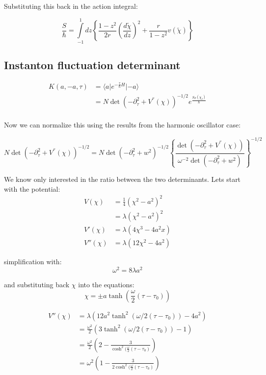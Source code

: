 \documentclass[12pt,a4paper]{article}
\newcommand{\ket}[1]{{ |#1 \rangle}}
\newcommand{\bra}[1]{{\langle#1|}}
\numberwithin{equation}{section}
\begin{document}
Substituting this back in the action integral:

\begin{equation}
\frac{S}{\hbar} = \int\limits_{-1}^1 dz \left\lbrace \frac{1-z^2}{2r} \left( \frac{d \tilde{\chi}}{dz} \right)^2 + \frac{r}{1-z^2} v(\tilde{\chi}) \right\rbrace
\end{equation}


\subsection{Instanton fluctuation determinant}

\begin{align}
K(a,-a,\tau) &= \bra{a} e^{-\frac{\tau}{\hbar}H} \ket{-a} \\
&= N \det (-\partial_\tau ^2 + V^{''}(\chi))^{-1/2} e^{\frac{S_E (\chi_{I})}{\hbar}}\\
\end{align}

Now we can normalize this using the results from the harmonic oscillator case:

\begin{equation}
N \det (-\partial_\tau ^2 + V^{''}(\chi))^{-1/2} = N \det (-\partial_\tau ^2 + w^2)^{-1/2} \left\lbrace\frac{ \det (-\partial_\tau ^2 + V^{''}(\chi))}{\omega^{-2}\det (-\partial_\tau ^2 + w^2)}\right\rbrace^{-1/2}
\end{equation}

We know only interested in the ratio between the two determinants. Lets start with the potential:
\begin{align}
V(\chi) &= \frac{1}{4}(\chi^2 -a^2)^2 \\
&= \lambda (\chi^2 - a^2 )^2 \\
V'(\chi) &= \lambda (4\chi^3 - 4a^2 x) \\
V''(\chi) &= \lambda (12\chi^2 - 4a^2)
\end{align}

simplification with:
\begin{equation}
\omega^2 = 8\lambda a^2
\end{equation}

and substituting back $\chi$ into the equations:
\begin{equation}
\chi = \pm a \tanh (\frac{\omega}{2} (\tau - \tau_0))
\end{equation}

\begin{align}
V''(\chi) &= \lambda (12 a^2 \tanh^2 (\omega /2 (\tau - \tau_0)) - 4a^2)\\
&= \frac{\omega^2}{2} (3 \tanh^2 (\omega /2 (\tau - \tau_0)) - 1) \\
&= \frac{\omega^2}{2} \left( 2 - \frac{3}{\cosh^2 (\frac{\omega}{2} (\tau-\tau_0)}\right) \\
&= \omega^2 \left( 1 - \frac{3}{2\cosh^2 (\frac{\omega}{2} (\tau-\tau_0)}\right)
\end{align}
\end{document}
